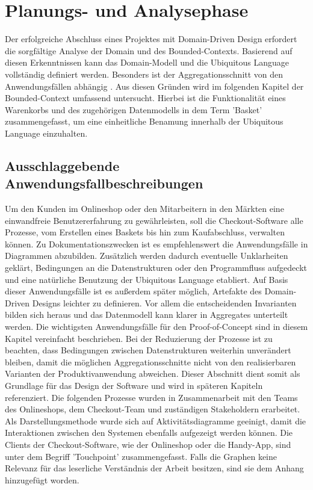 

\chapter{Planungs- und Analysephase}

Der erfolgreiche Abschluss eines Projektes mit Domain-Driven Design erfordert die sorgfältige Analyse der Domain und des Bounded-Contexts. Basierend auf diesen Erkenntnissen kann das Domain-Modell und die Ubiquitous Language vollständig definiert werden. Besonders ist der Aggregationsschnitt von den Anwendungsfällen abhängig \cite[S. 358]{Vernon.2015}. Aus diesen Gründen wird im folgenden Kapitel der Bounded-Context umfassend untersucht. Hierbei ist die Funktionalität eines Warenkorbs und des zugehörigen Datenmodells in dem Term 'Basket' zusammengefasst, um eine einheitliche Benamung innerhalb der Ubiquitous Language einzuhalten.

\section{Ausschlaggebende Anwendungsfallbeschreibungen}


Um den Kunden im Onlineshop oder den Mitarbeitern in den Märkten eine einwandfreie Benutzererfahrung zu gewährleisten, soll die Checkout-Software alle Prozesse, vom Erstellen eines Baskets bis hin zum Kaufabschluss, verwalten können. Zu Dokumentationszwecken ist es empfehlenswert die Anwendungsfälle in Diagrammen abzubilden. Zusätzlich werden dadurch eventuelle Unklarheiten geklärt, Bedingungen an die Datenstrukturen oder den Programmfluss aufgedeckt und eine natürliche Benutzung der Ubiquitous Language etabliert. Auf Basis dieser Anwendungsfälle ist es außerdem später möglich, Artefakte des Domain-Driven Designs leichter zu definieren. Vor allem die entscheidenden Invarianten bilden sich heraus und das Datenmodell kann klarer in Aggregates unterteilt werden. Die wichtigsten Anwendungsfälle für den Proof-of-Concept sind in diesem Kapitel vereinfacht beschrieben. Bei der Reduzierung der Prozesse ist zu beachten, dass Bedingungen zwischen Datenstrukturen weiterhin unverändert bleiben, damit die möglichen Aggregationsschnitte nicht von den realisierbaren Varianten der Produktivanwendung abweichen. Dieser Abschnitt dient somit als Grundlage für das Design der Software und wird in späteren Kapiteln referenziert. Die folgenden Prozesse wurden in Zusammenarbeit mit den Teams des Onlineshops, dem Checkout-Team und zuständigen \Gls{Stakeholder}n erarbeitet. Als Darstellungsmethode wurde sich auf Aktivitätsdiagramme geeinigt, damit die Interaktionen zwischen den Systemen ebenfalls aufgezeigt werden können. Die Clients der Checkout-Software, wie der Onlineshop oder die Handy-App, sind unter dem Begriff 'Touchpoint' zusammengefasst. Falls die Graphen keine Relevanz für das leserliche Verständnis der Arbeit besitzen, sind sie dem Anhang hinzugefügt worden.


